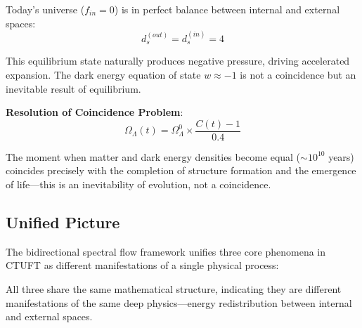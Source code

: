 Today's universe ($f_{in} = 0$) is in perfect balance between internal and external spaces:
\begin{equation}
d_s^{(out)} = d_s^{(in)} = 4
\end{equation}

This equilibrium state naturally produces negative pressure, driving accelerated expansion. The dark energy equation of state $w \approx -1$ is not a coincidence but an inevitable result of equilibrium.

\textbf{Resolution of Coincidence Problem}:
\begin{equation}
\Omega_\Lambda(t) = \Omega_\Lambda^0 \times \frac{C(t) - 1}{0.4}
\end{equation}

The moment when matter and dark energy densities become equal ($\sim 10^{10}$ years) coincides precisely with the completion of structure formation and the emergence of life—this is an inevitability of evolution, not a coincidence.

\subsection{Unified Picture}

The bidirectional spectral flow framework unifies three core phenomena in CTUFT as different manifestations of a single physical process:

\begin{center}
\end{center}

All three share the same mathematical structure, indicating they are different manifestations of the same deep physics—energy redistribution between internal and external spaces.


